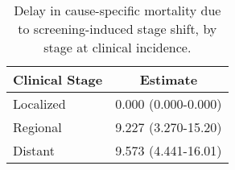 \documentclass[11pt]{article}
\begin{document}
\begin{table}[!ht]
\centering
\begin{tabular}{lc}
  \hline
Clinical Stage & Estimate \\ 
  \hline
Localized & 0.000 (0.000-0.000) \\ 
  Regional & 9.227 (3.270-15.20) \\ 
  Distant & 9.573 (4.441-16.01) \\ 
   \hline
\end{tabular}
\caption{Delay in cause-specific mortality due to screening-induced stage shift, by stage at clinical incidence.} 
\label{tab:delay}
\end{table}


\end{document}
